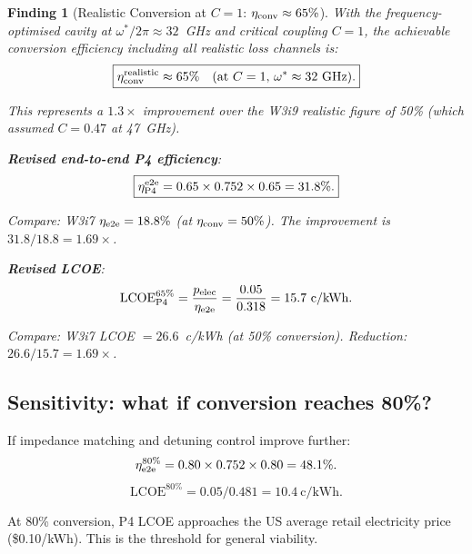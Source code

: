 \documentclass[11pt]{article}
\newtheorem{finding}{Finding}
\begin{document}
\begin{finding}[Realistic Conversion at $C = 1$: $\eta_{\rm conv} \approx 65\%$]
\label{find:realistic-65}
With the frequency-optimised cavity at $\omega^*/2\pi \approx 32$~GHz and
critical coupling $C = 1$, the achievable conversion efficiency including
all realistic loss channels is:
\begin{equation}
\boxed{\eta_{\rm conv}^{\rm realistic} \approx 65\%
\quad\text{(at $C = 1$, $\omega^* \approx 32$~GHz).}}
\label{eq:eta-65}
\end{equation}

This represents a $1.3\times$ improvement over the W3i9 realistic figure of
50\% (which assumed $C = 0.47$ at 47~GHz).

\textbf{Revised end-to-end P4 efficiency}:
\begin{equation}
\boxed{
\eta_{\rm P4}^{\rm e2e} = 0.65 \times 0.752 \times 0.65 = 31.8\%.
}
\label{eq:eta-e2e-65}
\end{equation}

Compare: W3i7 $\eta_{\rm e2e} = 18.8\%$ (at $\eta_{\rm conv} = 50\%$).
The improvement is $31.8/18.8 = 1.69\times$.

\textbf{Revised LCOE}:
\begin{equation}
\text{LCOE}_{\rm P4}^{65\%} = \frac{p_{\rm elec}}{\eta_{\rm e2e}}
= \frac{0.05}{0.318} = 15.7~\text{c/kWh}.
\label{eq:LCOE-65}
\end{equation}

Compare: W3i7 LCOE $= 26.6$~c/kWh (at 50\% conversion). Reduction:
$26.6/15.7 = 1.69\times$.
\end{finding}

\subsection{Sensitivity: what if conversion reaches 80\%?}

If impedance matching and detuning control improve further:
\begin{equation}
\eta_{\rm e2e}^{80\%} = 0.80 \times 0.752 \times 0.80 = 48.1\%.
\end{equation}
\begin{equation}
\text{LCOE}^{80\%} = 0.05/0.481 = 10.4~\text{c/kWh}.
\end{equation}

At 80\% conversion, P4 LCOE approaches the US average retail electricity
price (\$0.10/kWh). This is the threshold for general viability.

\end{document}
